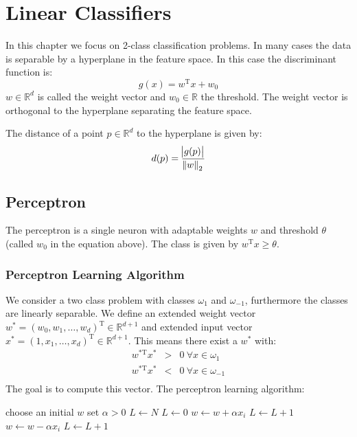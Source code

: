 \chapter{Linear Classifiers}
In this chapter we focus on 2-class classification problems.
In many cases the data is separable by a hyperplane in the feature space. 
In this case the discriminant function is:
\begin{equation*}
    g(x) = w^\text{T} x + w_0
\end{equation*}
$w \in \mathbb{R}^d$ is called the weight vector and $w_0 \in \mathbb{R}$ the threshold.
The weight vector is orthogonal to the hyperplane separating the feature space.

The distance of a point $p \in \mathbb{R}^d$ to the hyperplane is given by:
\begin{equation*}
    d(p) = \frac{\abs{g(p)}}{\norm{w}_2}
\end{equation*}

\section{Perceptron}
The perceptron is a single neuron with adaptable weights $w$ and threshold $\theta$ (called $w_0$ in the equation above). The class is given by $w^\text{T} x \geq \theta$.

\subsection{Perceptron Learning Algorithm}
We consider a two class problem with classes $\omega_1$ and $\omega_{-1}$, furthermore the classes are linearly separable. We define an extended weight vector $w^* = {(w_0, w_1, \ldots, w_d)}^\text{T} \in \mathbb{R}^{d+1}$ and extended input vector $x^* = {(1, x_1, \ldots, x_d)}^\text{T} \in \mathbb{R}^{d+1}$. This means there exist a $w^*$ with:
\begin{eqnarray*}
    w^{*\text{T}} x^* &>& 0\ \forall x \in \omega_1 \\
    w^{*\text{T}} x^* &<& 0\ \forall x \in \omega_{-1} \\
\end{eqnarray*}
The goal is to compute this vector. The perceptron learning algorithm:
\begin{algorithmic}
    \State choose an initial $w$
    \State set $\alpha > 0$
    \State $L \gets N$
        $L \gets 0$
                \State $w \gets w + \alpha x_i$
                \State $L \gets L + 1$
                \State $w \gets w - \alpha x_i$
                \State $L \gets L + 1$
            \EndIf
        \EndFor
    \EndWhile
\end{algorithmic}

